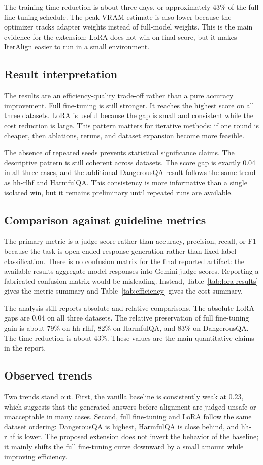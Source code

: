 \documentclass[10pt,twocolumn]{article}
\newcommand{\dataset}{DangerousQA}
\begin{document}
The training-time reduction is about three days, or approximately 43\% of the full fine-tuning schedule. The peak VRAM estimate is also lower because the optimizer tracks adapter weights instead of full-model weights. This is the main evidence for the extension: LoRA does not win on final score, but it makes IterAlign easier to run in a small environment.

\subsection{Result interpretation}
The results are an efficiency-quality trade-off rather than a pure accuracy improvement. Full fine-tuning is still stronger. It reaches the highest score on all three datasets. LoRA is useful because the gap is small and consistent while the cost reduction is large. This pattern matters for iterative methods: if one round is cheaper, then ablations, reruns, and dataset expansion become more feasible.

The absence of repeated seeds prevents statistical significance claims. The descriptive pattern is still coherent across datasets. The score gap is exactly 0.04 in all three cases, and the additional \dataset{} result follows the same trend as hh-rlhf and HarmfulQA. This consistency is more informative than a single isolated win, but it remains preliminary until repeated runs are available.

\subsection{Comparison against guideline metrics}
The primary metric is a judge score rather than accuracy, precision, recall, or F1 because the task is open-ended response generation rather than fixed-label classification. There is no confusion matrix for the final reported artifact: the available results aggregate model responses into Gemini-judge scores. Reporting a fabricated confusion matrix would be misleading. Instead, Table~\ref{tab:lora-results} gives the metric summary and Table~\ref{tab:efficiency} gives the cost summary.

The analysis still reports absolute and relative comparisons. The absolute LoRA gaps are 0.04 on all three datasets. The relative preservation of full fine-tuning gain is about 79\% on hh-rlhf, 82\% on HarmfulQA, and 83\% on \dataset. The time reduction is about 43\%. These values are the main quantitative claims in the report.

\subsection{Observed trends}
Two trends stand out. First, the vanilla baseline is consistently weak at 0.23, which suggests that the generated answers before alignment are judged unsafe or unacceptable in many cases. Second, full fine-tuning and LoRA follow the same dataset ordering: \dataset{} is highest, HarmfulQA is close behind, and hh-rlhf is lower. The proposed extension does not invert the behavior of the baseline; it mainly shifts the full fine-tuning curve downward by a small amount while improving efficiency.
\end{document}
